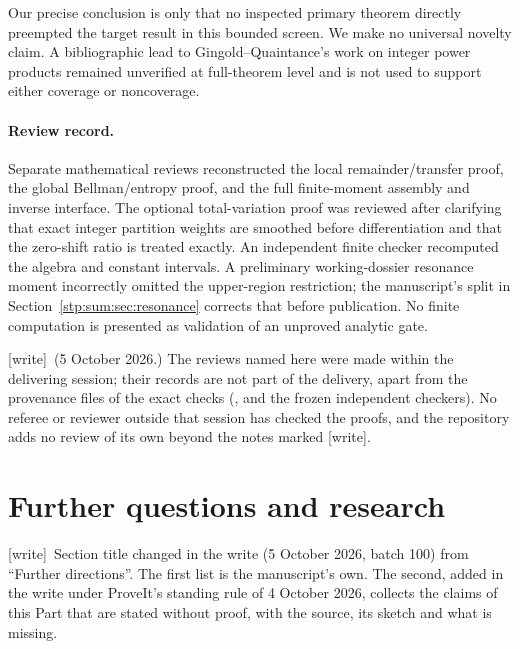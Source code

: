 \documentclass[11pt]{article}
\theoremstyle{remark}\newtheorem{remark}[theorem]{Remark}
\newcommand{\wtag}{\textup{[write]}}
\begin{document}
Our precise conclusion is only that no inspected primary theorem directly preempted the target result in this bounded screen. We make no universal novelty claim. A bibliographic lead to Gingold--Quaintance's work on integer power products remained unverified at full-theorem level and is not used to support either coverage or noncoverage.

\paragraph{Review record.}
Separate mathematical reviews reconstructed the local remainder/transfer proof, the global Bellman/entropy proof, and the full finite-moment assembly and inverse interface. The optional total-variation proof was reviewed after clarifying that exact integer partition weights are smoothed before differentiation and that the zero-shift ratio is treated exactly. An independent finite checker recomputed the algebra and constant intervals. A preliminary working-dossier resonance moment incorrectly omitted the upper-region restriction; the manuscript's split in Section~\ref{stp:sum:sec:resonance} corrects that before publication. No finite computation is presented as validation of an unproved analytic gate.

\wtag\ (5 October 2026.) The reviews named here were made within the
delivering session; their records are not part of the delivery, apart from
the provenance files of the exact checks (,
 and the frozen
independent checkers). No referee or reviewer outside that session has
checked the proofs, and the repository adds no review of its own beyond the
notes marked \wtag.

\section{Further questions and research}\label{stp:sum:sec:further}
\wtag\ Section title changed in the write (5 October 2026, batch 100) from
``Further directions''. The first list is the manuscript's own. The second,
added in the write under ProveIt's standing rule of 4 October 2026, collects
the claims of this Part that are stated without proof, with the source, its
sketch and what is missing.
\end{document}
